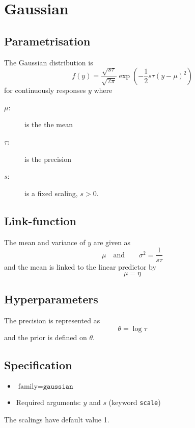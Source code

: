 \documentclass[a4paper,11pt]{article}
\begin{document}
\section*{Gaussian}

\subsection*{Parametrisation}

The Gaussian distribution is
\begin{displaymath}
    f(y) = \frac{\sqrt{s\tau}}{\sqrt{2\pi}} \exp\left( -\frac{1}{2}
      s\tau \left(y-\mu\right)^{2}\right)
\end{displaymath}
for continuously responses $y$ where
\begin{description}
\item[$\mu$:] is the the mean
\item[$\tau$:] is the precision
\item[$s$:] is a fixed scaling, $s>0$.    
\end{description}

\subsection*{Link-function}

The mean and variance of $y$ are given as
\begin{displaymath}
    \mu \quad\text{and}\qquad \sigma^{2} = \frac{1}{s\tau}
\end{displaymath}
and the mean is linked to the linear predictor by
\begin{displaymath}
    \mu = \eta
\end{displaymath}

\subsection*{Hyperparameters}

The precision is represented as
\begin{displaymath}
    \theta = \log \tau
\end{displaymath}
and the prior is defined on $\theta$. 

\subsection*{Specification}

\begin{itemize}
\item $\text{family}=\texttt{gaussian}$
\item Required arguments: $y$ and $s$ (keyword \texttt{scale})
\end{itemize}
The scalings have default value 1.
\end{document}
